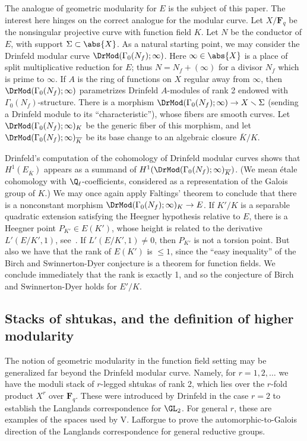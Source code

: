 \documentclass{article}
\def\F{\mathbf{F}}
\begin{document}
The analogue of geometric modularity for $E$ is the subject of this paper.  The interest here hinges on the correct analogue for the modular curve.  Let $X/\F_q$ be the nonsingular projective curve with function field $K$.  
Let $N$ be the conductor of $E$, with support $\Sigma\subset \abs{X}$.  As a natural starting point, we may consider the Drinfeld modular curve $\DrMod(\Gamma_0(N_f);\infty)$.  Here $\infty\in\abs{X}$ is a place of split multiplicative reduction for $E$;  thus $N=N_f+(\infty)$ for a divisor $N_f$ which is prime to $\infty$.  If $A$ is the ring of functions on $X$ regular away from $\infty$, then $\DrMod(\Gamma_0(N_f);\infty)$ parametrizes Drinfeld $A$-modules of rank 2 endowed with $\Gamma_0(N_f)$-structure.  There is a morphism $\DrMod(\Gamma_0(N_f);\infty)\to X\smallsetminus \Sigma$ (sending a Drinfeld module to its ``characteristic''), whose fibers are smooth curves.  Let $\DrMod(\Gamma_0(N_f);\infty)_K$ be the generic fiber of this morphism, and let $\DrMod(\Gamma_0(N_f);\infty)_{\overline{K}}$ be its base change to an algebraic closure $\overline{K}/K$.


Drinfeld's computation \cite{DrinfeldEllipticModules} of the cohomology of Drinfeld modular curves shows that $H^1(E_{\overline{K}})$ appears as a summand of $H^1(\DrMod(\Gamma_0(N_f);\infty)_{\overline{K}})$.   (We mean \'etale cohomology with $\Q_\ell$-coefficients, considered as a representation of the Galois group of $K$.) We may once again apply Faltings' theorem to conclude that there is a nonconstant morphism $\DrMod(\Gamma_0(N_f);\infty)_K\to E$.  If $K'/K$ is a separable quadratic extension satisfying the Heegner hypothesis relative to $E$, there is a Heegner point $P_{K'}\in E(K')$, whose height is related to the derivative $L'(E/K',1)$, see~\cite[Remark 1.5]{YunZhangShtukasII}.  If $L'(E/K',1)\neq 0$, then $P_{K'}$ is not a torsion point.  But also we have that the rank of $E(K')$ is $\leq 1$,  since the ``easy inequality'' of the Birch and Swinnerton-Dyer conjecture is a theorem for function fields.  We conclude immediately that the rank is exactly 1, and so the conjecture of Birch and Swinnerton-Dyer holds for $E'/K$.

\subsection{Stacks of shtukas, and the definition of higher modularity}

The notion of geometric modularity in the function field setting may be generalized far beyond the Drinfeld modular curve.  Namely, for $r=1,2,\dots$ we have the moduli stack of $r$-legged shtukas of rank 2, which lies over the $r$-fold product $X^r$ over $\F_q$.  These were introduced by Drinfeld \cite{DrinfeldLanglandsConjectureForGL2} in the case $r=2$ to establish the Langlands correspondence for $\GL_2$.  For general $r$, these are examples of the spaces used by V. Lafforgue \cite{VincentLafforgueChtoucas} to prove the automorphic-to-Galois direction of the Langlands correspondence for general reductive groups.  
\end{document}
